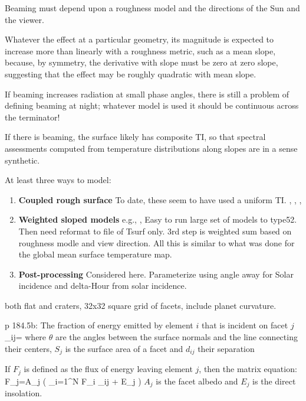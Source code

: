 \documentclass{article}
\begin{document}
Beaming must depend upon a roughness model and the directions of the Sun and the
viewer.

Whatever the effect at a particular geometry, its magnitude is expected to
increase more than linearly with a roughness metric, such as a mean slope,
because, by symmetry, the derivative with slope must be zero at zero slope,
suggesting that the effect may be roughly quadratic with mean slope.

If beaming increases radiation at small phase angles, there is still a problem
of defining beaming at night; whatever model is used it should be continuous
across the terminator!

If there is beaming, the surface likely has composite TI, so that spectral
assessments computed from temperature distributions along slopes are in a sense
synthetic.

At least three ways to model:
 \begin{enumerate}    %
\item  \textbf{Coupled rough surface} To date, these seem to have used a uniform TI. , , ,  
\item  \textbf{Weighted sloped models} e.g., , 
 Easy to run large set of models to type52. Then need reformat to file of Tsurf only. 3rd step is weighted sum based on roughness modle and view direction. All this is similar to what was done for the global mean surface temperature map.

\item  \textbf{Post-processing} Considered here. Parameterize using angle away for Solar incidence and delta-Hour from solar incidence. 
\end{enumerate}

 both flat and craters, 32x32 square grid of facets,
 include planet curvature. 

p 184.5b: The fraction of energy emitted by element $i$ that is incident on
facet $j$ 
\qbn \alpha_{ij}= \qen 
where $\theta$ are the angles between the surface normals and the line
connecting their centers, $S_j$ is the surface area of a facet and $d_{ij}$
their separation

If $F_j$ is defined as the flux of energy leaving element $j$, then the matrix equation:
\qb F_j=A_j \left( \sum_{i=1}^N F_i \alpha_{ij} + E_j \right) \qe
$A_j$ is the facet albedo and $E_j$ is the direct insolation.
\end{document}
